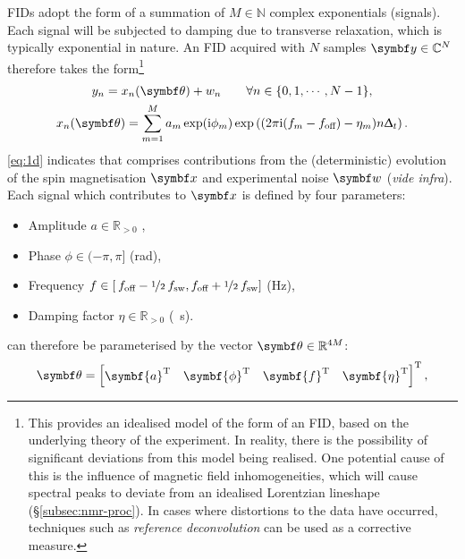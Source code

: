 \acp{FID} adopt the form of a summation of $M \in \mathbb{N}$ complex
exponentials (signals). Each signal will be subjected to damping due to
transverse relaxation, which is typically exponential in nature. An \ac{FID}
acquired with $N$ samples $\by \in \mathbb{C}^{N}$ therefore takes the
form\footnote{
    This provides an idealised model of the form of an \ac{FID}, based on the
    underlying theory of the experiment. In reality, there is the possibility
    of significant deviations from this model being realised. One potential
    cause of this is the influence of magnetic field inhomogeneities, which
    will cause spectral peaks to deviate from an idealised Lorentzian lineshape
    (\S \ref{subsec:nmr-proc}). In cases where distortions to the data have
occurred, techniques such as \emph{reference deconvolution}\cite{Morris1997}
can be used as a corrective measure.}
\begin{subequations}
    \begin{gather}
        y_n = x_n(\bth) + w_n \quad
            \quad \forall n \in \lbrace 0, 1, \cdots, N - 1 \rbrace,
            \label{eq:y=x+w} \\
        x_n(\bth) =
        \sumM \amexpphim \exp\left(
            (2 \pi \iu (f_m - \foff)- \eta_m ) n \Dt
        \right).
        \label{eq:x}
    \end{gather}
    \label{eq:1d}%
\end{subequations}%
\eqref{eq:1d} indicates that  comprises contributions from the
(deterministic) evolution of the spin magnetisation $\bx$ and experimental
noise $\bw$ (\emph{vide infra}). Each signal which contributes to $\bx$ is
defined by four parameters:
\begin{itemize}
    \item Amplitude $a \in \mathbb{R}_{>0}$ ,
    \item Phase $\phi \in (-\pi, \pi]$ (\unit{\radian}),
    \item Frequency $f \in \left[\hspace*{2pt}f_{\text{off}} - \nicefrac{1}{2} \hspace*{2pt}
        f_{\mathrm{sw}}, f_{\text{off}} + \nicefrac{1}{2} \hspace*{2pt}f_{\mathrm{sw}} \right]$ (\unit{\hertz}),
    \item Damping factor $\eta \in \mathbb{R}_{>0}$ (\unit{\per\second}).
\end{itemize}%
 can therefore be parameterised by the vector $\bth \in
\mathbb{R}^{4M}$:
\begin{equation}
    \bth =
    \begin{bmatrix}
        \symbf{a}\T & \symbf{\phi}\T & \symbf{f}\T & \symbf{\eta}\T
    \end{bmatrix}\T,
\end{equation}
